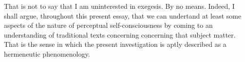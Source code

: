 That is not to say that I am uninterested in exegesis. By no means. Indeed, I shall argue, throughout this present essay, that we can undertand at least some aspects of the nature of perceptual self-consciousness by coming to an understanding of traditional texts concerning concerning that subject matter. That is the sense in which the present investigation is aptly described as a hermeneutic phenomenology. 

%
%
%

